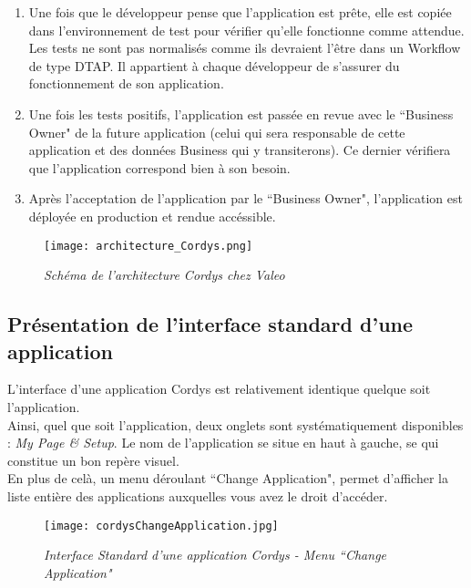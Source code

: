\begin{enumerate}
	\item Une fois que le développeur pense que l'application est prête, elle est copiée dans l'environnement de test pour vérifier qu'elle fonctionne comme attendue.\\
	Les tests ne sont pas normalisés comme ils devraient l'être dans un Workflow de type DTAP. Il appartient à chaque développeur de s'assurer du fonctionnement de son application.\\
	 \item Une fois les tests positifs, l'application est passée en revue avec le ``Business Owner" de la future application (celui qui sera responsable de cette application et des données Business qui y transiterons). Ce dernier vérifiera que l'application correspond bien à son besoin. \\
	 \item Après l'acceptation de l'application par le ``Business Owner", l'application est déployée en production et rendue accéssible.
\end{enumerate}

 \begin{figure}[H]
    \centering
    \texttt{[image: architecture\_Cordys.png]}
	\caption{\textit{Schéma de l'architecture Cordys chez Valeo}}\label{image.architectureCordys} 
\end{figure}

\clearpage

\subsection{Présentation de l'interface standard d'une application}


L'interface d'une application Cordys est relativement identique quelque soit l'application.\\
Ainsi, quel que soit l'application, deux onglets sont systématiquement disponibles : \textit{My Page \& Setup}.
Le nom de l'application se situe en haut à gauche, se qui constitue un bon repère visuel.\\
En plus de celà, un menu déroulant ``Change Application", permet d'afficher la liste entière des applications auxquelles vous avez le droit d'accéder.

 \begin{figure}[H]
    \centering
    \texttt{[image: cordysChangeApplication.jpg]}
	\caption{\textit{Interface Standard d'une application Cordys - Menu ``Change Application"}}\label{image.CordysChangeApplication} 
\end{figure}


